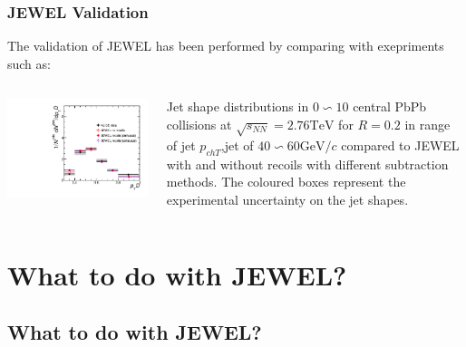 \documentclass{beamer}
\begin{document}
\begin{frame}\frametitle{JEWEL Validation}
    \begin{minipage}{1\textwidth}
	The validation of JEWEL has been performed by comparing with exepriments such as:    
    \end{minipage}
    \begin{columns}
    \begin{column}{0.5\textwidth}
	\begin{minipage}[l]{0.5\textwidth}
	\includegraphics[scale=0.2]{images/alice_jewel.png}
	\end{minipage}
	\end{column}
    \begin{column}{0.5\textwidth}
	\begin{minipage}[r]{1\textwidth}
	Jet shape distributions in $0\backsim10$ central PbPb collisions at $\sqrt{s_{NN}}=2.76\mathrm{TeV}$ for $R=0.2$ in range of jet $p_{chT}$,jet of $40\backsim60\mathrm{GeV}/c$ compared to JEWEL with and without recoils with different subtraction methods. The coloured boxes represent the experimental uncertainty on the jet shapes.
	\end{minipage}
	\end{column}
	\end{columns}
\end{frame}

\section{What to do with JEWEL?}
\subsection{What to do with JEWEL?}
\end{document}
